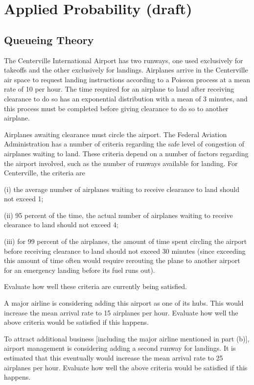 \chapter{Applied Probability (draft)}

\section{Queueing Theory}

\begin{problem} The Centerville International Airport has two runways, one used exclusively for takeoffs and the other exclusively for landings. Airplanes arrive in the Centerville air space to request landing instructions according to a Poisson process at a mean rate of 10 per hour. The time required for an airplane to land after receiving clearance to do so has an exponential distribution with a mean of 3 minutes, and this process must be completed before giving clearance to do so to another airplane. 

Airplanes awaiting clearance must circle the airport. The Federal Aviation Administration has a number of criteria regarding the safe level of congestion of airplanes waiting to land. These criteria depend on a number of factors regarding the airport involved, such as the number of runways available for landing. For Centerville, the criteria are 
\ben
\item[(i)] the average number of airplanes waiting to receive clearance to land should not exceed 1;
\item[(ii)] 95 percent of the time, the actual number of airplanes waiting to receive clearance to land should not exceed 4;
\item[(iii)] for 99 percent of the airplanes, the amount of time spent circling the airport before receiving clearance to land should not exceed 30 minutes (since exceeding this amount of time often would require rerouting the plane to another airport for an emergency landing before its fuel runs out).
\een
\ben
\item Evaluate how well these criteria are currently being satisfied.
\item A major airline is considering adding this airport as one of its hubs. This would increase the mean arrival rate to 15 airplanes per hour. Evaluate how well the above criteria would be satisfied if this happens.
\item To attract additional business [including the major airline mentioned in part (b)], airport management is considering adding a second runway for landings. It is estimated that this eventually would increase the mean arrival rate to 25 airplanes per hour. Evaluate how well the above criteria
would be satisfied if this happens.
\een
\end{problem}

